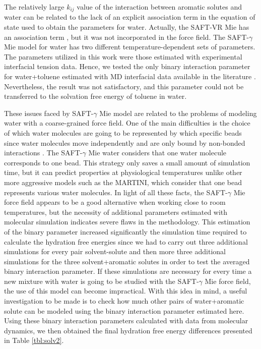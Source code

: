 The relatively large $k_{ij}$ value of the interaction between aromatic solutes and water can be related to the lack of an explicit association term in the equation of state used to obtain the parameters for water. Actually, the SAFT-VR Mie has an association term \cite{lafitte2013}, but it was not incorporated in the force field. The SAFT-$\gamma$ Mie model for water \cite{lobanova2016} has two different temperature-dependent sets of parameters. The parameters utilized in this work were those estimated with experimental interfacial tension data. Hence, we tested the only binary interaction parameter for water+toluene estimated with MD interfacial data available in the literature . Nevertheless, the result was not satisfactory, and this parameter could not be transferred to the solvation free energy of toluene in water. 

These issues faced by SAFT-$\gamma$ Mie model are related to the problems of modeling water with a coarse-grained force field. One of the main difficulties is the choice of which water molecules are going to be represented by which specific beads since water molecules move independently and are only bound by non-bonded interactions \cite{hadley2010,hadley2012}. The  SAFT-$\gamma$ Mie water considers that one water molecule corresponds to one bead. This strategy only saves a small amount of simulation time, but it can predict properties at physiological temperatures unlike other more aggressive models such as the MARTINI, which consider that one bead represents various water molecules. In light of all these facts, the SAFT-$\gamma$ Mie force field appears to be a good alternative when working close to room temperatures, but the necessity of additional parameters estimated with molecular simulation indicates severe flaws in the methodology. This estimation of the binary parameter increased significantly the simulation time required to calculate the hydration free energies since we had to carry out three additional simulations for every pair solvent-solute and then more three additional simulations for the three solvent+aromatic solutes in order to test the averaged binary interaction parameter. If these simulations are necessary for every time a new mixture with water is going to be studied with the SAFT-$\gamma$ Mie force field, the use of this model can become impractical.  With this idea in mind, a useful investigation to be made is to check how much other pairs of water+aromatic solute can be modeled using the binary interaction parameter estimated here. Using these binary interaction parameters calculated with data from molecular dynamics, we then obtained the final hydration free energy differences presented in Table \ref{tbl:solv2}. 

